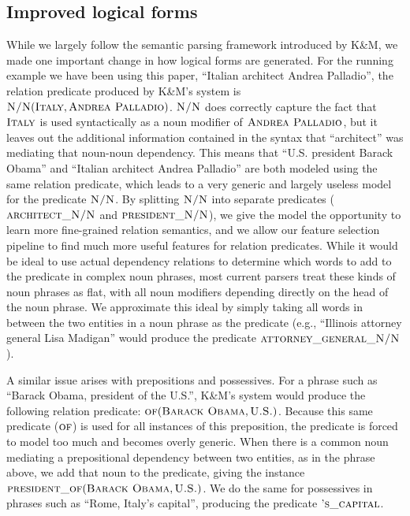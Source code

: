 \documentclass[11pt]{article}
\newcommand{\predicate}[1]{\ensuremath{\textsc{#1}}}
\newcommand{\entity}[1]{\ensuremath{\textsc{#1}}}
\begin{document}


\subsection{Improved logical forms}
\label{sec:better-lfs}

While we largely follow the semantic parsing framework introduced by K\&M, we
made one important change in how logical forms are generated.  For the running
example we have been using this paper, ``Italian architect Andrea Palladio'',
the relation predicate produced by K\&M's system is
$\predicate{N/N}(\entity{Italy}, \entity{Andrea Palladio})$.  \predicate{N/N}
does correctly capture the fact that \entity{Italy} is used syntactically as a
noun modifier of \entity{Andrea Palladio}, but it leaves out the additional
information contained in the syntax that ``architect'' was mediating that
noun-noun dependency.  This means that ``U.S. president Barack Obama'' and
``Italian architect Andrea Palladio'' are both modeled using the same relation
predicate, which leads to a very generic and largely useless model for the
predicate \predicate{N/N}.  By splitting \predicate{N/N} into separate
predicates (\predicate{architect\_N/N} and \predicate{president\_N/N}), we give
the model the opportunity to learn more fine-grained relation semantics, and we
allow our feature selection pipeline to find much more useful features for
relation predicates.  While it would be ideal to use actual dependency
relations to determine which words to add to the predicate in complex noun
phrases, most current parsers treat these kinds of noun phrases as flat, with
all noun modifiers depending directly on the head of the noun phrase.  We
approximate this ideal by simply taking all words in between the two entities
in a noun phrase as the predicate (e.g., ``Illinois attorney general Lisa
Madigan'' would produce the predicate \predicate{attorney\_general\_N/N}).

A similar issue arises with prepositions and possessives.  For a phrase such as
``Barack Obama, president of the U.S.'', K\&M's system would produce the
following relation predicate: $\predicate{of}(\entity{Barack Obama},
\entity{U.S.})$.  Because this same predicate (\predicate{of}) is used for all
instances of this preposition, the predicate is forced to model too much and
becomes overly generic.  When there is a common noun mediating a prepositional
dependency between two entities, as in the phrase above, we add that noun to
the predicate, giving the instance $\predicate{president\_of}(\entity{Barack
Obama}, \entity{U.S.})$.  We do the same for possessives in phrases such as
``Rome, Italy's capital'', producing the predicate \predicate{'s\_capital}.
\end{document}
